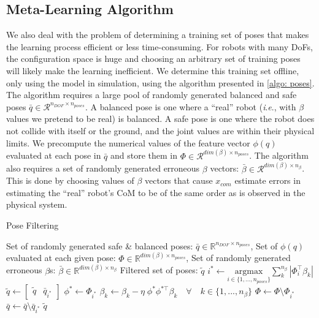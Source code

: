 \documentclass[letterpaper, 10 pt, conference]{ieeeconf}
\newcommand{\ie}{\textit{i}.\textit{e}., }
\begin{document}
\subsection{Meta-Learning Algorithm} \label{subsec: meta-learning}

We also deal with the problem of determining a training set of poses that makes
the learning process efficient or less time-consuming. For robots with many
\aclp{DoF}, the configuration space is huge and choosing an arbitrary set of
training poses will likely make the learning inefficient. We determine this
training set offline, only using the model in simulation, using the algorithm
presented in \cref{algo: poses}. The algorithm requires a large pool of randomly
generated balanced and safe poses $\bar{q} \in \mathcal{R}^{n_{DOF} \times
n_{poses}}$. A balanced pose is one where a ``real'' robot (\ie with $\beta$
values we pretend to be real) is balanced. A safe pose is one where the robot
does not collide with itself or the ground, and the joint values are within
their physical limits. We precompute the numerical values of the feature vector
$\phi(q)$ evaluated at each pose in $\bar{q}$ and store them in $\Phi \in
\mathcal{R}^{dim(\beta) \times n_{poses}}$. The algorithm also requires a set of
randomly generated erroneous $\beta$ vectors: $\bar\beta \in
\mathcal{R}^{dim(\beta) \times n_{\beta}}$. This is done by choosing values of
$\beta$ vectors that cause $x_{com}$ estimate errors in estimating the ``real''
robot's \ac{CoM} to be of the same order as is observed in the physical system.
\begin{algorithm}
    \caption{Pose Filtering}
    \begin{algorithmic}[1]
        \renewcommand{\algorithmicrequire}{\textbf{Input:}}
        \renewcommand{\algorithmicensure}{\textbf{Output:}}
        \REQUIRE Set of randomly generated safe \& balanced poses: $\bar{q} \in
        \mathbb{R}^{n_{DOF} \times n_{poses}}$,
        \newline Set of $\phi(q)$ evaluated at each given pose: $\Phi \in
        \mathbb{R}^{dim(\beta) \times n_{poses}}$,
        \newline Set of randomly generated erroneous $\beta$s: $\bar{\beta} \in
        \mathbb{R}^{dim(\beta)
        \times n_{\beta}}$
        \ENSURE Filtered set of poses: $\widetilde{q}$
        \REPEAT
        \STATE $i^* \leftarrow \underset{i \in \{1, ...,
        n_{poses}\}}{\mathrm{argmax}}
        \sum_{k}^{n_{\beta}} | \Phi_i^\top \beta_k |$
        \STATE $\widetilde{q} \leftarrow [\begin{matrix} \widetilde{q} &
        \bar{q}_{i^*} \end{matrix}] $
        \STATE $\phi^* \leftarrow \Phi_{i^{*}}$
        \STATE $\beta_k \leftarrow \beta_k - \eta \; \phi^* \phi^{*\top} \beta_k
        \quad \forall \quad k \in \{1, ..., n_\beta \}$
        \STATE $\Phi \leftarrow  \Phi \setminus \Phi_{i^*} $
        \STATE $\bar{q} \leftarrow \bar{q} \setminus \bar{q}_{i^*} $
        \RETURN $\widetilde{q}$
    \end{algorithmic}
    \label{algo: poses}
\end{algorithm}
\end{document}
